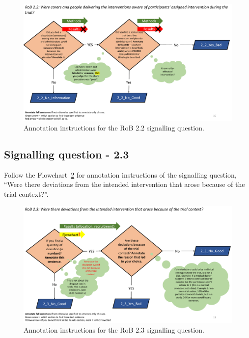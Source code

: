 \documentclass[sn-mathphys,Numbered]{sn-jnl}%
\begin{document}
%
\begin{figure}[hbt]
    \centering
    \includegraphics[width=\textwidth]{figures/2_2.pdf}
    \caption{Annotation instructions for the RoB 2.2 signalling question.}
    \label{fig:2_2}
\end{figure}
%


%
%
%
\subsection*{Signalling question - 2.3}
\label{subsec:2_3}
%
Follow the Flowchart~\ref{fig:2_3} for annotation instructions of the signalling question, ``Were there deviations from the intended intervention that arose because of the trial context?''.
%
\begin{figure}[hbt]
    \centering
    \includegraphics[width=\textwidth]{figures/2_3.pdf}
    \caption{Annotation instructions for the RoB 2.3 signalling question.}
    \label{fig:2_3}
\end{figure}
%
\end{document}
